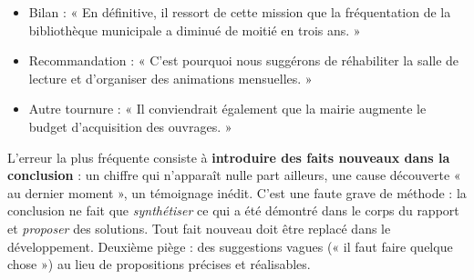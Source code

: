 \documentclass[11pt]{article}
\begin{document}
\begin{exemplebox}
\begin{itemize}
\item Bilan : « En définitive, il ressort de cette mission que la fréquentation de la bibliothèque municipale a diminué de moitié en trois ans. »
\item Recommandation : « C'est pourquoi nous suggérons de réhabiliter la salle de lecture et d'organiser des animations mensuelles. »
\item Autre tournure : « Il conviendrait également que la mairie augmente le budget d'acquisition des ouvrages. »
\end{itemize}
\end{exemplebox}

\begin{attention}
L'erreur la plus fréquente consiste à \textbf{introduire des faits nouveaux dans la conclusion} : un chiffre qui n'apparaît nulle part ailleurs, une cause découverte « au dernier moment », un témoignage inédit. C'est une faute grave de méthode : la conclusion ne fait que \emph{synthétiser} ce qui a été démontré dans le corps du rapport et \emph{proposer} des solutions. Tout fait nouveau doit être replacé dans le développement. Deuxième piège : des suggestions vagues (« il faut faire quelque chose ») au lieu de propositions précises et réalisables.
\end{attention}
\end{document}
